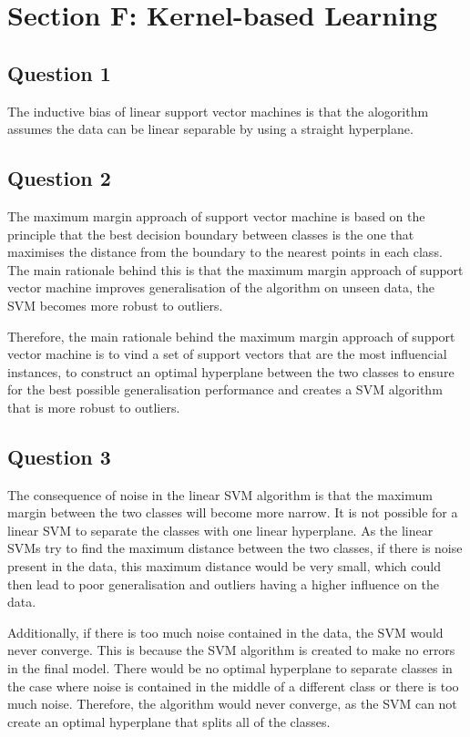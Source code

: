 \documentclass[10pt]{article}
\begin{document}
\section*{Section F: Kernel-based Learning}

\subsection*{Question 1}

The inductive bias of linear support vector machines is that the alogorithm
assumes the data can be linear separable by using a straight hyperplane.

\subsection*{Question 2}

The maximum margin approach of support vector machine is based on the principle
that the best decision boundary between classes is the one that maximises the distance from the
boundary to the nearest points in each class. The main rationale behind this is that the
maximum margin approach of support vector machine improves generalisation of the algorithm on unseen
data, the SVM becomes more robust to outliers.

Therefore, the main rationale behind the maximum margin approach of support vector machine
is to vind a set of support vectors that are the most influencial instances, to construct an optimal
hyperplane between the two classes to ensure for the best possible generalisation performance and
creates a SVM algorithm that is more robust to outliers.

\subsection*{Question 3}

The consequence of noise in the linear SVM algorithm is that
the maximum margin between the two classes will become more narrow. It is not possible for a linear
SVM to separate the classes with one linear hyperplane. As the linear SVMs try to find
the maximum distance between the two classes, if there is noise present in the data, this maximum distance
would be very small, which could then lead to poor generalisation and outliers having a higher influence on the data.

Additionally, if there is too much noise contained in the data, the SVM would never converge. This is because
the SVM algorithm is created to make no errors in the final model. There would be no optimal hyperplane to separate classes in the case
where noise is contained in the middle of a different class or there is too much noise. Therefore, the algorithm would never converge, 
as the SVM can not create an optimal hyperplane that splits all of the classes.
\end{document}
